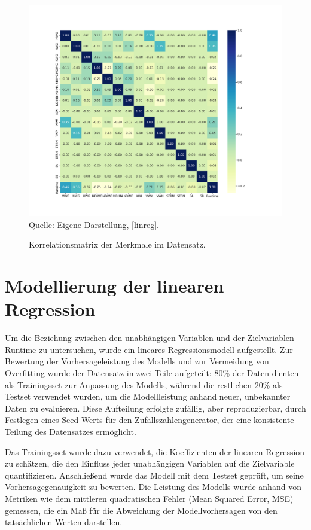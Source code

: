\begin{figure}[!h]
    \caption{Korrelationsmatrix der Merkmale im Datensatz.}
    \includegraphics[width=1\textwidth]{../scripts/images/corr_gpu.png}
    Quelle: Eigene Darstellung, \ref{linreg}.
    \label{pic:corr}
\end{figure}

\section{Modellierung der linearen Regression}

Um die Beziehung zwischen den unabhängigen Variablen und der Zielvariablen 
Runtime zu untersuchen, wurde ein lineares Regressionsmodell aufgestellt. 
Zur Bewertung der Vorhersageleistung des Modells und zur Vermeidung von Overfitting wurde der 
Datensatz in zwei Teile aufgeteilt: 80\% der Daten dienten als Trainingsset zur 
Anpassung des Modells, während die restlichen 20\% als Testset verwendet wurden, 
um die Modellleistung anhand neuer, unbekannter Daten zu evaluieren. 
Diese Aufteilung erfolgte zufällig, aber reproduzierbar, durch Festlegen eines Seed-Werts 
für den Zufallszahlengenerator, der eine konsistente Teilung des Datensatzes ermöglicht.

Das Trainingsset wurde dazu verwendet, die Koeffizienten der linearen Regression zu schätzen, 
die den Einfluss jeder unabhängigen Variablen auf die Zielvariable quantifizieren. 
Anschließend wurde das Modell mit dem Testset geprüft, um seine Vorhersagegenauigkeit zu bewerten. 
Die Leistung des Modells wurde anhand von Metriken wie dem mittleren quadratischen Fehler (Mean Squared Error, MSE) gemessen, 
die ein Maß für die Abweichung der Modellvorhersagen von den tatsächlichen Werten darstellen.

